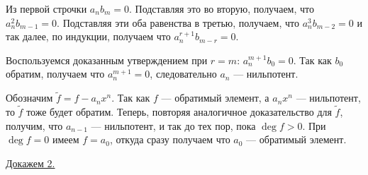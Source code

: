 \begin{Proof}
\begin{Proof}
            Из первой строчки $a_nb_m = 0$. Подставляя это во вторую, получаем, что \linebreak $a_n^2b_{m - 1} = 0$. Подставляя эти оба равенства в третью,
            получаем, что $a_n^3b_{m - 2} = 0$ и так далее, по индукции, получаем что $a_n^{r + 1}b_{m - r} = 0$.
        \end{Proof}
        
        Воспользуемся доказанным утверждением при $r = m$: $a_n^{m + 1}b_0 = 0$. Так как $b_0$ обратим, получаем что $a_n^{m + 1} = 0$, следовательно $a_n$ --- нильпотент.

        Обозначим $\tilde{f} = f - a_nx^n$. Так как $f$ --- обратимый элемент, а $a_nx^n$ --- нильпотент, то $\tilde{f}$ тоже будет обратим. Теперь, повторяя аналогичное доказательство для $\tilde{f}$,
        получим, что $a_{n - 1}$ --- нильпотент, и так до тех пор, пока $\deg f > 0$. При $\deg f = 0$ имеем $f = a_0$, откуда сразу получаем что $a_0$ --- обратимый элемент. 
    \end{Proof}
    \underline{Докажем 2.}

